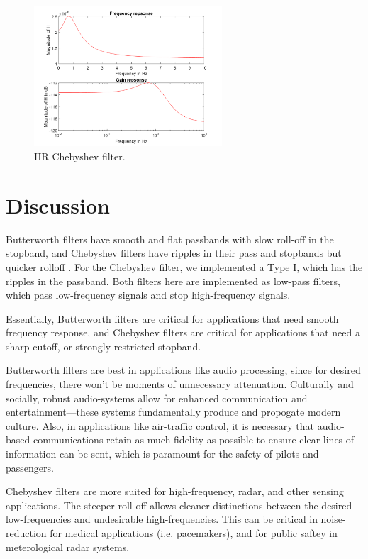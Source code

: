 \documentclass{IEEEtran}
\begin{document}
\begin{figure}[!ht] 
    \centering
    \includegraphics[width = 7cm]{chebyshev.png}
    \caption{IIR Chebyshev filter.}
    \label{fig:chebyshev}
\end{figure}

\section{Discussion}

Butterworth filters have smooth and flat passbands with slow roll-off in the stopband, and Chebyshev filters have ripples in their pass and stopbands but quicker rolloff \cite{textbook}. For the Chebyshev filter, we implemented a Type I, which has the ripples in the passband. Both filters here are implemented as low-pass filters, which pass low-frequency signals and stop high-frequency signals.

Essentially, Butterworth filters are critical for applications that need smooth frequency response, and Chebyshev filters are critical for applications that need a sharp cutoff, or strongly restricted stopband.

Butterworth filters are best in applications like audio processing, since for desired frequencies, there won't be moments of unnecessary attenuation. Culturally and socially, robust audio-systems allow for enhanced communication and entertainment---these systems fundamentally produce and propogate modern culture. Also, in applications like air-traffic control, it is necessary that audio-based communications retain as much fidelity as possible to ensure clear lines of information can be sent, which is paramount for the safety of pilots and passengers. 

Chebyshev filters are more suited for high-frequency, radar, and other sensing applications. The steeper roll-off allows cleaner distinctions between the desired low-frequencies and undesirable high-frequencies. This can be critical in noise-reduction for medical applications (i.e. pacemakers), and for public saftey in meterological radar systems.



\end{document}
